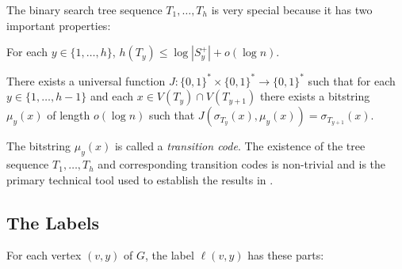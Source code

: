 \documentclass{patmorin}
\begin{document}
The binary search tree sequence $T_1,\ldots,T_h$ is very special because it has two important properties:
\begin{compactenum}[(P1)]\setcounter{enumi}{4}
    \item For each $y\in\{1,\ldots,h\}$, $h(T_y)\le \log|S^+_y|+o(\log n)$.
    \item There exists a universal function $J:\{0,1\}^*\times\{0,1\}^*\to\{0,1\}^*$ such that for each $y\in\{1,\ldots,h-1\}$ and each $x\in V(T_y)\cap V(T_{y+1})$ there exists a bitstring $\mu_y(x)$ of length $o(\log n)$ such that $J(\sigma_{T_y}(x),\mu_y(x))=\sigma_{T_{y+1}}(x)$.
\end{compactenum}
The bitstring $\mu_y(x)$ is called a \emph{transition code}.  The existence of the tree sequence $T_1,\ldots,T_h$ and corresponding transition codes is non-trivial and is the primary technical tool used to establish the results in \cite{dujmovic.esperet.ea:adjacency,esperet.joret.ea:sparse}.



\subsection{The Labels}
\label{labels-i}

For each vertex $(v,y)$ of $G$, the label $\ell(v,y)$ has these parts:
\end{document}
